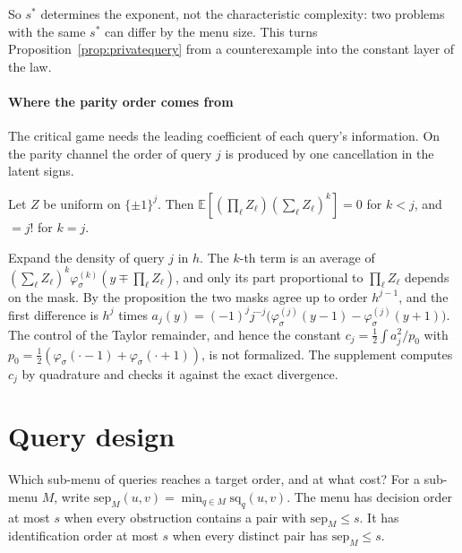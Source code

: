 So $s^*$ determines the exponent, not the characteristic complexity: two problems with the same
$s^*$ can differ by the menu size. This turns Proposition~\ref{prop:privatequery} from a
counterexample into the constant layer of the law.

\paragraph{Where the parity order comes from} The critical game needs the leading coefficient of
each query's information. On the parity channel the order of query $j$ is produced by one
cancellation in the latent signs.

\begin{proposition}
\label{prop:paritymoment}
Let $Z$ be uniform on $\{\pm1\}^j$. Then $\mathbb E[(\prod_\ell Z_\ell)(\sum_\ell Z_\ell)^k]=0$ for
$k<j$, and $=j!$ for $k=j$.
\end{proposition}

Expand the density of query $j$ in $h$. The $k$-th term is an average of
$(\sum_\ell Z_\ell)^k\varphi_\sigma^{(k)}(y\mp\prod_\ell Z_\ell)$, and only its part proportional to
$\prod_\ell Z_\ell$ depends on the mask. By the proposition the two masks agree up to order
$h^{j-1}$, and the first difference is $h^j$ times
$a_j(y)=(-1)^jj^{-j}\bigl(\varphi_\sigma^{(j)}(y-1)-\varphi_\sigma^{(j)}(y+1)\bigr)$. The control of
the Taylor remainder, and hence the constant
$c_j=\frac12\int a_j^2/p_0$ with $p_0=\frac12(\varphi_\sigma(\cdot-1)+\varphi_\sigma(\cdot+1))$,
is not formalized. The supplement computes $c_j$ by quadrature and checks it against the exact
divergence.

\section{Query design}
\label{sec:design}

Which sub-menu of queries reaches a target order, and at what cost? For a sub-menu $M$, write
$\mathrm{sep}_M(u,v)=\min_{q\in M}\mathrm{sq}_q(u,v)$. The menu has decision order at most $s$
when every obstruction contains a pair with $\mathrm{sep}_M\le s$. It has identification order
at most $s$ when every distinct pair has $\mathrm{sep}_M\le s$.

